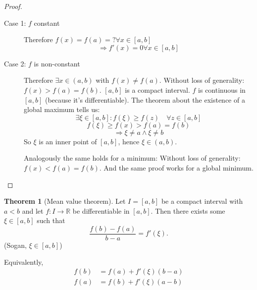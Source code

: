 \documentclass[a4paper,landscape,twocolumn]{article}
\theoremstyle{definition}
\newtheorem{theorem}{Theorem}
\begin{document}
\begin{proof}
  \begin{description}
    \item[Case 1: $f$ constant]
      Therefore $f(x) = f(a) = ? \forall x \in [a,b]$
      \[ \Rightarrow f'(x) = 0 \forall x \in [a,b] \]
    \item[Case 2: $f$ is non-constant]
      Therefore $\exists x \in (a, b)$ with $f(x) \neq f(a)$.
      Without loss of generality: $f(x) > f(a) = f(b)$.
      $[a,b]$ is a compact interval. $f$ is continuous in $[a,b]$
      (because it's differentiable). The theorem about the
      existence of a global maximum tells us:
      \[ \exists \xi \in [a,b]: f(\xi) \geq f(z) \quad\forall z \in [a,b] \]
      \[ f(\xi) \geq f(x) > f(a) = f(b) \]
      \[ \Rightarrow \xi \neq a \land \xi \neq b \]
      So $\xi$ is an inner point of $[a,b]$, hence $\xi \in (a,b)$.

      Analogously the same holds for a minimum:
      Without loss of generality: $f(x) < f(a) = f(b)$.
      And the same proof works for a global minimum.
  \end{description}
\end{proof}
%
\begin{theorem}[Mean value theorem]
  Let $I = [a,b]$ be a compact interval with $a<b$ and let $f: I \to \mathbb R$
  be differentiable in $[a,b]$. Then there exists some $\xi \in [a,b]$ such that
  \[ \frac{f(b) - f(a)}{b - a} = f'(\xi). \]
  (Sogan, $\xi \in [a,b]$)

  Equivalently,
  \begin{align*}
    f(b) &= f(a) + f'(\xi)(b - a) \\
    f(a) &= f(b) + f'(\xi)(a - b)
  \end{align*}
\end{theorem}
%
\end{document}
